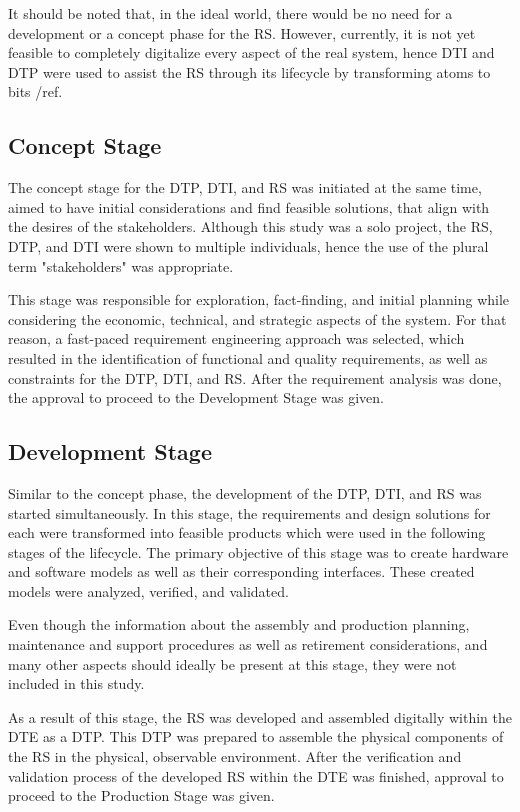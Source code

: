 \documentclass[conference]{IEEEtran}
\begin{document}
    It should be noted that, in the ideal world, there would be no need for a development or a concept phase for the RS. However, currently, it is not yet feasible to completely digitalize every aspect of the real system,
    hence  DTI and DTP were used to assist the RS through its lifecycle by transforming atoms to bits /ref.

    \subsection{Concept Stage}
    The concept stage for the DTP, DTI, and RS was initiated at the same time, aimed to have initial considerations and find feasible solutions, that align with the desires of the stakeholders. Although this study was a solo project, the RS, DTP, and DTI were shown to multiple individuals, hence the use of the plural term "stakeholders" was appropriate. 

    This stage was responsible for exploration, fact-finding, and initial planning while considering the economic, technical, and strategic aspects of the system. For that reason, a fast-paced requirement 
    engineering approach was selected, which resulted in the identification of functional and quality requirements, as well as constraints for the DTP, DTI, and RS.  
    After the requirement analysis was done, the approval to proceed to the Development Stage was given. 
    
    \subsection{Development Stage}
    Similar to the concept phase, the development of the  DTP, DTI, and RS was started simultaneously. In this stage, the requirements and design solutions for each were transformed 
    into feasible products which were used in the following stages of the lifecycle. The primary objective of this stage was to create hardware and software models as well as their corresponding interfaces. 
    These created models were analyzed, verified, and validated. 



    Even though the information about the assembly and production planning, maintenance and support procedures as well as retirement considerations, and many other aspects should ideally be present 
    at this stage, they were not included in this study. 

    As a result of this stage, the RS was developed and assembled digitally within the DTE as a DTP. This DTP was prepared to assemble the physical components of the RS in the physical, observable environment.  
    After the verification and validation process of the developed RS within the DTE was finished, approval to proceed to the Production Stage was given.
\end{document}

